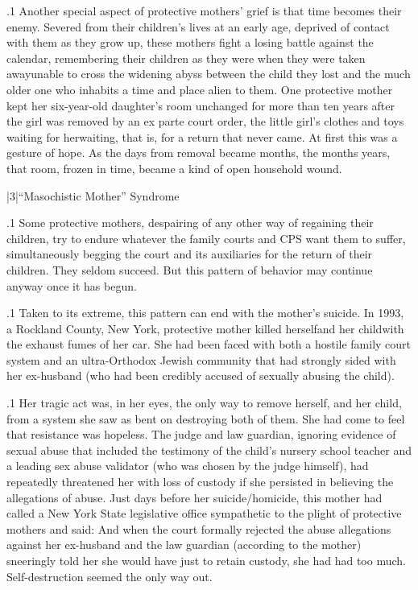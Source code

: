 \documentclass[11pt, twoside]{article}
\begin{document}
{\p.1{%
Another special aspect of protective mothers’ grief is that time
becomes their enemy. Severed from their children’s lives at an early age,
deprived of contact with them as they grow up, these mothers fight a
losing battle against the calendar, remembering their children as they
were when they were taken away\mdash{}unable to cross the widening abyss
between the child they lost and the much older one who inhabits a time
and place alien to them. One protective mother kept her six-year-old
daughter’s room unchanged for more than ten years after the girl was
removed by an ex parte court order, the little girl’s clothes and toys
waiting for her\mdash{}waiting, that is, for a return that never came. At first
this was a gesture of hope. As the days from removal became months,
the months years, that room, frozen in time, became a kind of open
household wound.
}%


\s|3|{``Masochistic Mother'' Syndrome}

\p.1{%
\noindent{}Some protective mothers, despairing of any other way of regaining their
children, try to endure whatever the family courts and CPS want them to
suffer, simultaneously begging the court and its auxiliaries for the return
of their children. They seldom succeed. But this pattern of behavior may
continue anyway once it has begun.
}%

\p.1{%
Taken to its extreme, this pattern can end with the mother’s suicide. In
1993, a Rockland County, New York, protective mother killed
herself\mdash{}and her child\mdash{}with the exhaust fumes of her car. She had been faced
with both a hostile family court system and an ultra-Orthodox Jewish
community that had strongly sided with her ex-husband (who had been
credibly accused of sexually abusing the child).
}%

\p.1{%
Her tragic act was, in her eyes, the only way to remove herself, and
her child, from a system she saw as bent on destroying both of them.
She had come to feel that resistance was hopeless. The judge and law
guardian, ignoring evidence of sexual abuse that included the testimony
of the child’s nursery school teacher and a leading sex abuse validator (who was chosen by the judge himself), had repeatedly threatened
her with loss of custody if she persisted in believing the allegations of
abuse. Just days before her suicide/homicide, this mother had called a
New York State legislative office sympathetic to the plight of protective mothers and said:  And when the court formally rejected the abuse allegations
against her ex-husband and the law guardian (according to the mother)
sneeringly told her she would have  just to retain custody, she had had too much. Self-destruction seemed the only
way out.
}%

}
\end{document}
